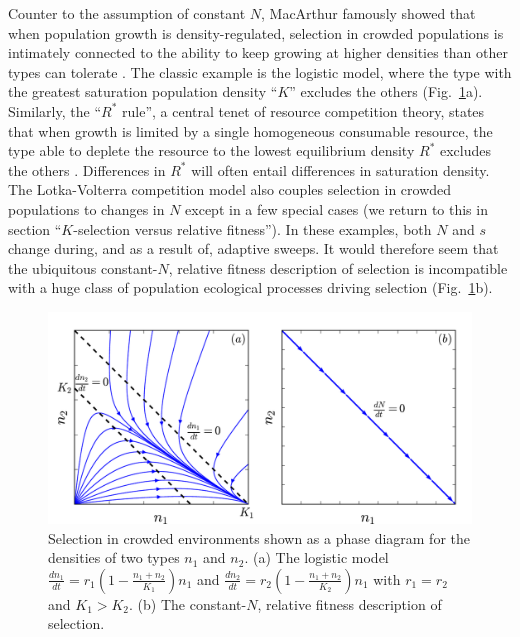 \documentclass[11pt]{article}
\begin{document}
Counter to the assumption of constant $N$, MacArthur famously showed that when population growth is density-regulated, selection in crowded populations is intimately connected to the ability to keep growing at higher densities than other types can tolerate \citep{macarthur_1967}. The classic example is the logistic model, where the type with the greatest saturation population density ``$K$'' excludes the others (Fig.~\ref{fig:Ksel}a). Similarly, the ``$R^*$ rule'', a central tenet of resource competition theory, states that when growth is limited by a single homogeneous consumable resource, the type able to deplete the resource to the lowest equilibrium density $R^*$ excludes the others \citep{grover_1997}. Differences in $R^*$ will often entail differences in saturation density. The Lotka-Volterra competition model also couples selection in crowded populations to changes in $N$ except in a few special cases (we return to this in section ``$K$-selection versus relative fitness''). In these examples, both $N$ and $s$ change during, and as a result of, adaptive sweeps. It would therefore seem that the ubiquitous constant-$N$, relative fitness description of selection is incompatible with a huge class of population ecological processes driving selection (Fig.~\ref{fig:Ksel}b).

\begin{figure}
\centering
\includegraphics[scale=0.8]{Kplot.pdf}
\caption{\label{fig:Ksel} Selection in crowded environments shown as a phase diagram for the densities of two types $n_1$ and $n_2$. (a) The logistic model $\frac{dn_1}{dt}=r_1(1-\frac{n_1+n_2}{K_1})n_1$ and $\frac{dn_2}{dt}=r_2(1-\frac{n_1+n_2}{K_2})n_1$ with $r_1=r_2$ and $K_1>K_2$. (b) The constant-$N$, relative fitness description of selection.}
\end{figure}
\end{document}
